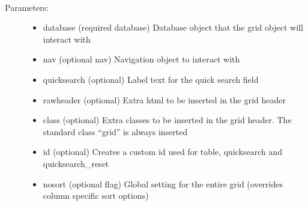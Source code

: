 \documentclass[letterpaper,10pt,english]{sphinxmanual}
\begin{document}
\begin{fulllineitems}

\begin{fulllineitems}
\label{knop_grid:knop_grid.onassign}
\end{fulllineitems}


\begin{fulllineitems}
\label{knop_grid:knop_grid.oncreate}
\end{fulllineitems}


\begin{fulllineitems}
~\begin{description}
\item[{Parameters:}] \leavevmode\begin{itemize}
\item {} 
database (required database)
Database object that the grid object will interact with

\item {} 
nav (optional nav)
Navigation object to interact with

\item {} 
quicksearch (optional)
Label text for the quick search field

\item {} 
rawheader (optional)
Extra html to be inserted in the grid header

\item {} 
class (optional)
Extra classes to be inserted in the grid header. The standard class ``grid'' is always inserted

\item {} 
id (optional)
Creates a custom id used for table, quicksearch and quicksearch\_reset

\item {} 
nosort (optional flag)
Global setting for the entire grid (overrides column specific sort options)


\end{itemize}
\end{description}
\end{fulllineitems}
\end{fulllineitems}
\end{document}
